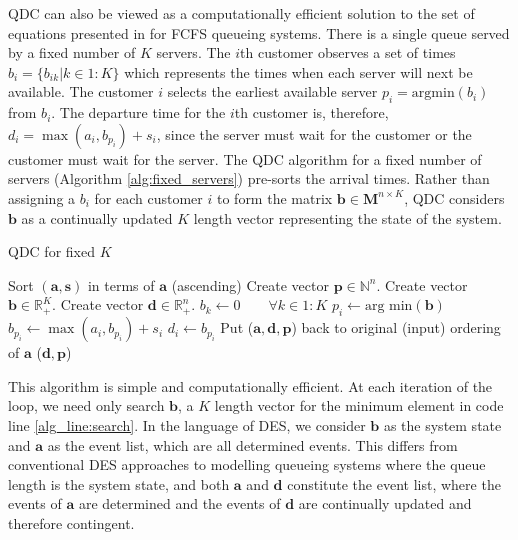 \documentclass[article]{jss}
\begin{document}
QDC can also be viewed as a computationally efficient solution to the set of equations presented in \citet[pg. 259]{sutton_bayesian_2011} for FCFS queueing systems. There is a single queue served by a fixed number of $K$ servers. The $i$th customer observes a set of times $b_i = \{ b_{ik} | k \in 1:K \}$ which represents the times when each server will next be available. The customer $i$ selects the earliest available server $p_i = \text{argmin}(b_i)$ from $b_i$. The departure time for the $i$th customer is, therefore, $d_i = \max({a_i, b_{p_i}}) + s_i$, since the server must wait for the customer or the customer must wait for the server. The QDC algorithm for a fixed number of servers (Algorithm \ref{alg:fixed_servers}) pre-sorts the arrival times. Rather than assigning a $b_i$ for each customer $i$ to form the matrix $\mathbf{b} \in \mathbf{M}^{n \times K}$, QDC considers $\mathbf{b}$ as a continually updated $K$ length vector representing the state of the system. 

\begin{algorithm}[ht!]
\caption{QDC for fixed $K$}
\label{alg:fixed_servers}
\begin{algorithmic}[1]
\State Sort $(\mathbf{a}, \mathbf{s})$ in terms of $\mathbf{a}$ (ascending)
\State Create vector $\mathbf{p} \in \mathbb{N}^{n}$.
\State Create vector $\mathbf{b} \in \mathbb{R}_{+}^{K}$. 
\State Create vector $\mathbf{d} \in \mathbb{R}_{+}^{n}$.
\State $b_k \leftarrow 0 \quad \quad \forall k \in 1:K $
  \State $p_i \leftarrow \text{arg min}(\mathbf{b}) $ \label{alg_line:search}
  \State $b_{p_i} \leftarrow \max(a_i, b_{p_i}) + s_i $
  \State $d_i \leftarrow b_{p_i}$ 
\EndFor 
\State Put ($\mathbf{a}, \mathbf{d}, \mathbf{p}$) back to original (input) ordering of $\mathbf{a}$ 
\State \Return ($\mathbf{d}, \mathbf{p}$)
\EndFunction
\end{algorithmic}
\end{algorithm}

This algorithm is simple and computationally efficient. At each iteration of the loop, we need only search $\mathbf{b}$, a $K$ length vector for the minimum element in code line \ref{alg_line:search}. In the language of DES, we consider $\mathbf{b}$ as the system state and $\mathbf{a}$ as the event list, which are all determined events. This differs from conventional DES approaches to modelling queueing systems where the queue length is the system state, and both $\mathbf{a}$ and $\mathbf{d}$ constitute the event list, where the events of $\mathbf{a}$ are determined and the events of $\mathbf{d}$ are continually updated and therefore contingent.  
\end{document}
